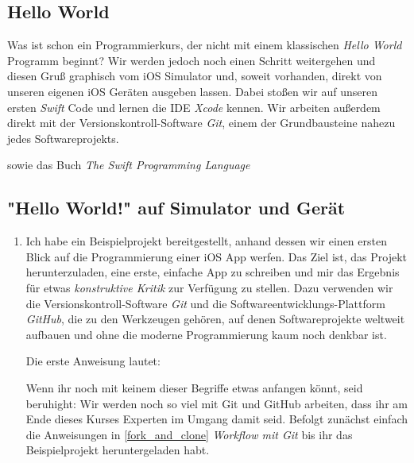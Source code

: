 \documentclass[parskip=half, final]{scrreprt}
\begin{document}
\begin{lecture} %


\chapter{Hello World}

Was ist schon ein Programmierkurs, der nicht mit einem klassischen \emph{Hello World} Programm beginnt? Wir werden jedoch noch einen Schritt weitergehen und diesen Gruß graphisch vom iOS Simulator und, soweit vorhanden, direkt von unseren eigenen iOS Geräten ausgeben lassen. Dabei stoßen wir auf unseren ersten \emph{Swift} Code und lernen die IDE \emph{Xcode} kennen. Wir arbeiten außerdem direkt mit der Versionskontroll-Software \emph{Git}, einem der Grundbausteine nahezu jedes Softwareprojekts.

 sowie das Buch \emph{The Swift Programming Language} 


\section{"{}Hello World!"{} auf Simulator und Gerät}

\begin{enumerate}

\item Ich habe ein Beispielprojekt bereitgestellt, anhand dessen wir einen ersten Blick auf die Programmierung einer iOS App werfen. Das Ziel ist, das Projekt herunterzuladen, eine erste, einfache App zu schreiben und mir das Ergebnis für etwas \emph{konstruktive Kritik} zur Verfügung zu stellen. Dazu verwenden wir die Versionskontroll-Software \emph{Git} und die Softwareentwicklungs-Plattform \emph{GitHub}, die zu den Werkzeugen gehören, auf denen Softwareprojekte weltweit aufbauen und ohne die moderne Programmierung kaum noch denkbar ist.

Die erste Anweisung lautet:


Wenn ihr noch mit keinem dieser Begriffe etwas anfangen könnt, seid beruhight: Wir werden noch so viel mit Git und GitHub arbeiten, dass ihr am Ende dieses Kurses Experten im Umgang damit seid. Befolgt zunächst einfach die Anweisungen in \autoref{fork_and_clone} \emph{Workflow mit Git} bis ihr das Beispielprojekt heruntergeladen habt.


\end{enumerate}
\end{lecture}
\end{document}
